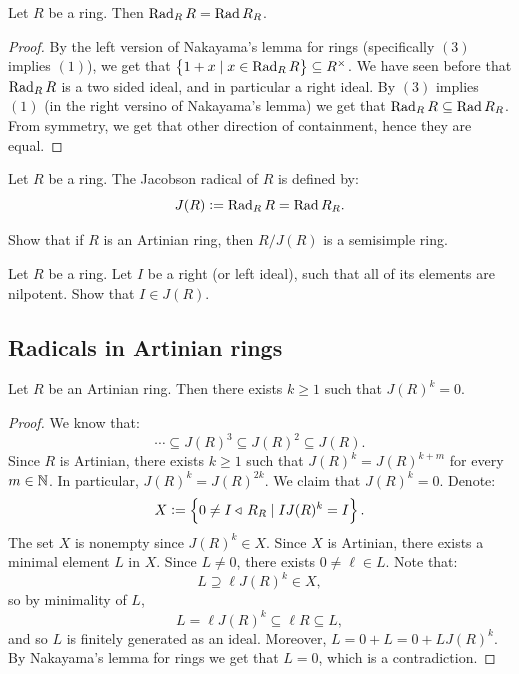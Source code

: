 \documentclass[11pt,a4paper]{article}
\begin{document}
\begin{corollary}
  Let $R$ be a ring.
  Then $\operatorname{Rad} _R R = \operatorname{Rad} R_R$.
\end{corollary}
\begin{proof}
  By the left version of Nakayama's lemma for rings (specifically $(3)$
  implies $(1)$),
  we get that $\left\{1 + x \mid x \in \operatorname{Rad}_R R\right\} \subseteq R^{\times}$.
  We have seen before that $\operatorname{Rad} _R R$ is a two sided ideal,
  and in particular a right ideal.
  By $(3)$ implies $(1)$ (in the right versino of Nakayama's lemma)
  we get that $\operatorname{Rad} _R R \subseteq \operatorname{Rad} R_R$.
  From symmetry, we get that other direction of containment,
  hence they are equal.
\end{proof}

\begin{definition}
  Let $R$ be a ring.
  The Jacobson radical of $R$ is defined by:
  \[
    J(R) := \operatorname{Rad} _R R = \operatorname{Rad} R_R.
  \]
\end{definition}

\begin{exercise}
  Show that if $R$ is an Artinian ring, then $R/J(R)$
  is a semisimple ring.
\end{exercise}

\begin{exercise}
  Let $R$ be a ring.
  Let $I$ be a right (or left ideal),
  such that all of its elements are nilpotent.
  Show that $I \in J(R)$.
\end{exercise}

\subsection{Radicals in Artinian rings}

\begin{proposition}
  Let $R$ be an Artinian ring.
  Then there exists $k \geq 1$ such that $J(R)^k = 0$.
\end{proposition}
\begin{proof}
  We know that:
  \[
    \cdots \subseteq J(R)^3 \subseteq J(R)^2 \subseteq J(R).
  \]
  Since $R$ is Artinian, there exists $k \geq 1$
  such that $J(R)^k = J(R)^{k+m}$ for every $m \in \mathbb{N}$.
  In particular, $J(R)^k = J(R)^{2k}$.
  We claim that $J(R)^k = 0$.
  Denote:
  \[
    X := \left\{0 \neq I \triangleleft\, R_R \mid I J(R)^k = I\right\}.
  \]
  The set $X$ is nonempty since $J(R)^k \in X$.
  Since $X$ is Artinian, there exists a minimal element $L$ in $X$.
  Since $L \neq 0$, there exists $0 \neq \ell \in L$.
  Note that:
  \[
    L \supseteq \ell J(R)^k \in X,
  \]
  so by minimality of $L$,
  \[
    L = \ell J(R)^k \subseteq \ell R \subseteq L,
  \]
  and so $L$ is finitely generated as an ideal.
  Moreover, $L = 0 + L = 0 + L J(R)^k$.
  By Nakayama's lemma for rings we get that $L = 0$,
  which is a contradiction.
\end{proof}
\end{document}
